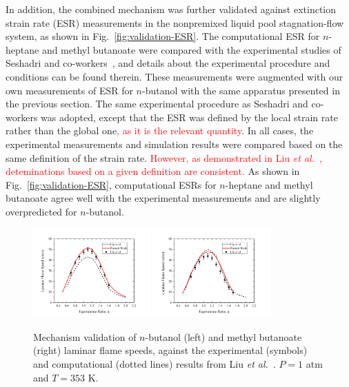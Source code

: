 \documentclass[review,3p,times]{elsarticleUS}
\begin{document}
In addition, the combined mechanism was further validated against extinction strain rate (ESR) measurements in the nonpremixed liquid pool stagnation-flow system, as shown in Fig.~\ref{fig:validation-ESR}.  The computational ESR for $n$-heptane and methyl butanoate were compared with the experimental studies of Seshadri and co-workers~\cite{seshadri08,niemann10}, and details about the experimental procedure and conditions can be found therein.  These measurements were augmented with our own measurements of ESR for $n$-butanol with the same apparatus presented in the previous section.  The same experimental procedure as Seshadri and co-workers was adopted, except that the ESR was defined by the local strain rate rather than the global one\textcolor{red}{, as it is the relevant quantity}.  In all cases, the experimental measurements and simulation results were compared based on the same definition of the strain rate.  \textcolor{red}{However, as demonstrated in Liu \emph{et al.}~\cite{liu11b}, deteminations based on a given definition are consistent.}  As shown in Fig.~\ref{fig:validation-ESR}, computational ESRs for $n$-heptane and methyl butanoate agree well with the experimental measurements and are slightly overpredicted for $n$-butanol.  

\begin{figure}[t]
  \centering
  \scriptsize
  \includegraphics[trim=4mm 8mm 30mm 20mm, clip=true, width=0.4\textwidth]{NB.png}
  \includegraphics[trim=4mm 8mm 30mm 20mm, clip=true, width=0.4\textwidth]{MB.png}
  \normalsize
  \vspace{-0.1in}
  \caption{Mechanism validation of $n$-butanol (left) and methyl butanoate (right) laminar flame speeds, against the experimental (symbols) and computational (dotted lines) results from Liu \emph{et al.}~\cite{liu11}. $P=1$ atm and $T=353$ K.}
  \label{fig:validation}
\end{figure}
\end{document}
